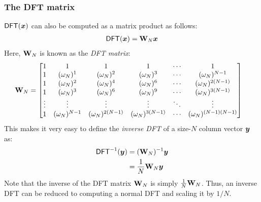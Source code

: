 \subsubsection{The DFT matrix}
\label{s:dft:matrix}
$\mathsf{DFT}(\bm{x})$ can also be computed as a matrix product as follows:
\begin{align}
    \mathsf{DFT}(\bm{x}) = \mathbf{W}_N \bm{x}
\end{align}
Here, $\mathbf{W}_N$ is known as the \textit{DFT matrix}:
\begin{align}
    \mathbf{W}_N&=
    \begin{bmatrix}
        1&1&1&1&\cdots &1\\1&(\omega_N)^1&(\omega_N)^{2}&(\omega_N)^{3}&\cdots &(\omega_N)^{N-1}\\
        1&(\omega_N)^{2}&(\omega_N)^{4}&(\omega_N)^{6}&\cdots &(\omega_N)^{2(N-1)}\\
        1&(\omega_N)^{3}&(\omega_N)^{6}&(\omega_N)^{9}&\cdots &(\omega_N)^{3(N-1)}\\
        \vdots &\vdots &\vdots &\vdots &\ddots &\vdots \\
        1&(\omega_N)^{N-1}&(\omega_N)^{2(N-1)}&(\omega_N)^{3(N-1)}&\cdots &(\omega_N)^{(N-1)(N-1)}
    \end{bmatrix}
\end{align}
This makes it very easy to define the \textit{inverse DFT} of a size-$N$ column vector $\bm{y}$ as:
\begin{align}
    \mathsf{DFT}^{-1}(\bm{y}) &= (\mathbf{W}_N)^{-1} \bm{y}\\
        &= \frac{1}{N} \mathbf{W}_N \bm{y}
\end{align}
Note that the inverse of the DFT matrix $\mathbf{W}_N$ is simply $\frac{1}{N} \mathbf{W}_N$.
Thus, an inverse DFT can be reduced to computing a normal DFT and scaling it by $1/N$.


